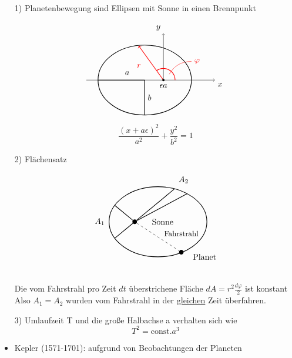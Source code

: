 \documentclass[titlepage,12pt,a4paper,ngerman]{report}
\newcommand{\tx}[1]{\textrm{#1}}
\begin{document}
{\newpage
\begin{itemize}
	\item[1)] Planetenbewegung sind Ellipsen mit Sonne in einen Brennpunkt\\
	\begin{minipage}{.5\linewidth}
		$$
		\begin{tikzpicture}
		\draw[->] (-2.5,0) -- (3,0) node[anchor=north west] {$x$};
		\draw[->] (.8,0) -- (.8,2) node[anchor=south east] {$y$};
		\draw[thick] (0,0) ellipse (2cm and 1.5cm);
		\draw[thick] (0,0)--(0,-1.5)  (0,-.75) node[right] {$b$};
		\draw[thick] (0,0)--(-2,0);
		\node at (-.75,.3) {$a$};
		\draw[red,thick] (.8+.5,0) arc (0:125:.5);
		\draw[red] (0.8+.25,.25) to [out=60,in=180 ] (2,.8) node[right] {$\varphi$};
		\draw[->,thick,red] (.8,0) -- (100:1.5cm);
		\node[red] at (-.25,.6) {$r$};
		\node at (.8,-.25) {$\epsilon a$};
		\node[circle, fill=black, inner sep=1] at (.8,0) {};
		\end{tikzpicture} 
		$$
	\end{minipage}
	\begin{minipage}{.5\linewidth}
		$$\frac{(x+a\epsilon)^2}{a^2} + \frac{y^2}{b^2} = 1$$
	\end{minipage}
	\item[2)] Flächensatz
	\begin{minipage}{.7\linewidth}
		$$
		\begin{tikzpicture}
		\draw[thick] (1,0) ellipse (2.1cm and 1.5cm);
		\node[circle,fill=black,inner sep=2] (a) at (2,-1.3) {};
		\node at (3,-1.5) {Planet}; 
		\node at (1.2,-0) {Sonne};
		\node at (2,-.5) {\small{Fahrstrahl}};
		\node[circle, fill=black,inner sep=2] (b) at (0,0) {};
		\draw[dashed] (b) -- (a);
		\draw[thick] (b) -- (2.25,1.2);
		\draw[thick] (b) -- (1.7,1.4);
		\draw[thick] (b) -- (-0.85,0.7);
		\draw[thick] (b) -- (-0.85,-0.7);
		\node at (-1.5,0) {$A_1$};
		\node at (2.1,1.8) {$A_2$};
		\end{tikzpicture}
		$$
	\end{minipage}\\[5pt]
	Die vom Fahrstrahl pro Zeit $ dt $ überstrichene Fläche $ dA = r^2 \frac{d\varphi}{2} $ ist konstant\\
	Also $ A_1 = A_2 $ wurden vom Fahrstrahl in der \underline{gleichen} Zeit überfahren.
	\item[3)] Umlaufzeit  T und die große Halbachse a verhalten sich wie
	$$ T^2 = \tx{const.} a^3$$
\end{itemize}
\begin{itemize}
	\item Kepler (1571-1701): aufgrund von Beobachtungen der Planeten

\end{itemize}}
\end{document}
